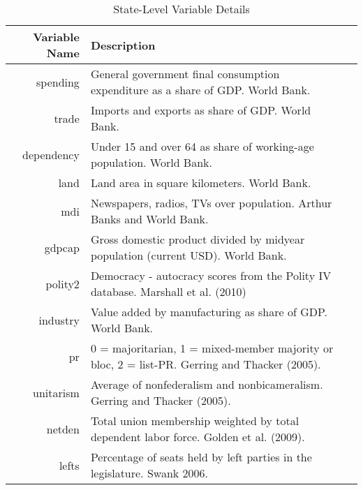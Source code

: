 
\begin{landscape}
\begin{table}[ht]
\caption{State-Level Variable Details}
\begin{center}
\begin{tabular}{rll}
  \hline
 Variable Name & Description \\ 
  \hline
spending & General government final consumption expenditure as a share of GDP. World Bank.\\ 
trade & Imports and exports as share of GDP. World Bank.\\ 
dependency & Under 15 and over 64 as share of working-age population. World Bank. \\ 
land & Land area in square kilometers. World Bank. \\ 
mdi & Newspapers, radios, TVs over population. Arthur Banks and World Bank.\\ 
gdpcap & Gross domestic product divided by midyear population (current USD). World Bank. \\ 
polity2 & Democracy - autocracy scores from the Polity IV database. Marshall et al. (2010) \\ 
industry & Value added by manufacturing as share of GDP. World Bank.\\ 
pr & 0 = majoritarian, 1 = mixed-member majority or bloc, 2 = list-PR. Gerring and Thacker (2005). \\ 
unitarism & Average of nonfederalism and nonbicameralism. Gerring and Thacker (2005). \\ 
netden & Total union membership weighted by total dependent labor force. Golden et al. (2009). \\ 
lefts & Percentage of seats held by left parties in the legislature. Swank 2006. \\ 
   \hline
\end{tabular}
\end{center}
\end{table}
\end{landscape}

